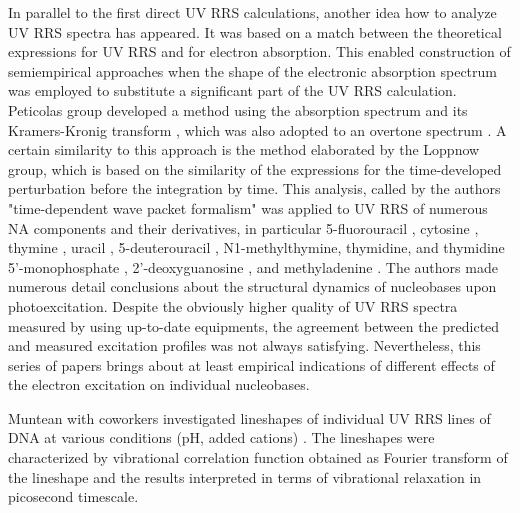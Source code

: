 In parallel to the first direct UV RRS calculations, another idea how to
analyze UV RRS spectra has appeared.
It was based on a match between the theoretical expressions for UV RRS and for
electron absorption.
This enabled construction of semiempirical approaches when the shape of the
electronic absorption spectrum was employed to substitute a significant part of
the UV RRS calculation.
Peticolas group developed a method using the absorption spectrum and its
Kramers-Kronig transform
\parencite{Blazej1980},
which was also adopted to an overtone spectrum
\parencite{Chinsky1982a}.
A certain similarity to this approach is the method elaborated by the Loppnow
group, which is based on the similarity of the expressions for the
time-developed perturbation before the integration by time.
This analysis, called by the authors "time-dependent wave packet formalism" was
applied to UV RRS of numerous NA components and their derivatives, in
particular 5-fluorouracil
\parencite{Billinghurst2006a},
cytosine
\parencite{Billinghurst2006},
thymine
\parencite{Yarasi2007},
uracil
\parencite{Yarasi2009},
5-deuterouracil
\parencite{Ng2011},
N1-methylthymine, thymidine, and thymidine 5'-monophosphate
\parencite{Billinghurst2012},
2'-deoxyguanosine
\parencite{El-Yazbi2011},
and methyladenine
\parencite{Oladepo2011}.
The authors made numerous detail conclusions about the structural dynamics of
nucleobases upon photoexcitation.
Despite the obviously higher quality of UV RRS spectra measured by using
up-to-date equipments, the agreement between the predicted and measured
excitation profiles was not always satisfying.
Nevertheless, this series of papers brings about at least empirical indications
of different effects of the electron excitation on individual nucleobases.

Muntean with coworkers investigated lineshapes of individual UV RRS lines of
DNA at various conditions (pH, added cations)
\parencite{%
	Muntean2017,%
	Muntean2020%
}.
The lineshapes were characterized by vibrational correlation function obtained
as Fourier transform of the lineshape and the results interpreted in terms of
vibrational relaxation in picosecond timescale.
